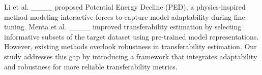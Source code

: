 Li et al. ____ proposed Potential Energy Decline (PED), a physics-inspired method modeling interactive forces to capture model adaptability during fine-tuning. Menta et al. ____ improved transferability estimation by selecting informative subsets of the target dataset using pre-trained model representations. However, existing methods overlook robustness in transferability estimation. Our study addresses this gap by introducing a framework that integrates adaptability and robustness for more reliable transferability metrics.